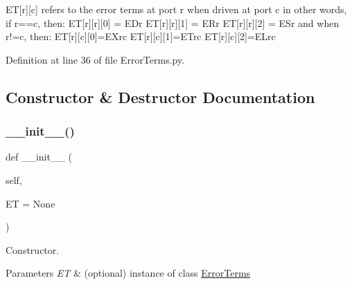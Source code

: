 ET\mbox{[}r\mbox{]}\mbox{[}c\mbox{]} refers to the error terms at port r when driven at port c in other words, if r==c, then\+: ET\mbox{[}r\mbox{]}\mbox{[}r\mbox{]}\mbox{[}0\mbox{]} = E\+Dr ET\mbox{[}r\mbox{]}\mbox{[}r\mbox{]}\mbox{[}1\mbox{]} = E\+Rr ET\mbox{[}r\mbox{]}\mbox{[}r\mbox{]}\mbox{[}2\mbox{]} = E\+Sr and when r!=c, then\+: ET\mbox{[}r\mbox{]}\mbox{[}c\mbox{]}\mbox{[}0\mbox{]}=E\+Xrc ET\mbox{[}r\mbox{]}\mbox{[}c\mbox{]}\mbox{[}1\mbox{]}=E\+Trc ET\mbox{[}r\mbox{]}\mbox{[}c\mbox{]}\mbox{[}2\mbox{]}=E\+Lrc 

Definition at line 36 of file Error\+Terms.\+py.



\subsection{Constructor \& Destructor Documentation}
\mbox{\label{classSignalIntegrity_1_1Measurement_1_1Calibration_1_1ErrorTerms_1_1ErrorTerms_ad8cdadc2d29a11c5f69d487c0bf1a7a3}} 
\subsubsection{\texorpdfstring{\+\_\+\+\_\+init\+\_\+\+\_\+()}{\_\_init\_\_()}}
{\footnotesize\ttfamily def \+\_\+\+\_\+init\+\_\+\+\_\+ (\begin{DoxyParamCaption}\item[{}]{self,  }\item[{}]{ET = {\ttfamily None} }\end{DoxyParamCaption})}



Constructor. 


\begin{DoxyParams}{Parameters}
{\em ET} & (optional) instance of class \hyperlink{classSignalIntegrity_1_1Measurement_1_1Calibration_1_1ErrorTerms_1_1ErrorTerms}{Error\+Terms} \\
\hline
\end{DoxyParams}


